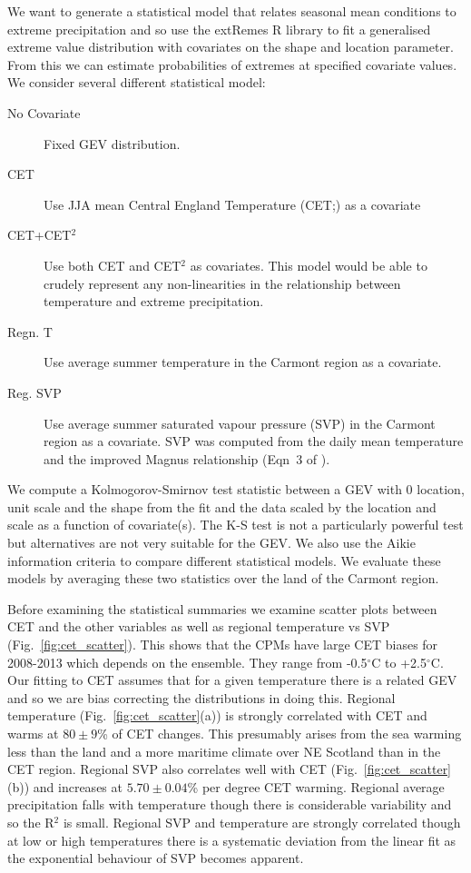 \documentclass[11pt,a4paper]{article}
\begin{document}
We want to generate a statistical model that relates seasonal mean conditions to extreme precipitation and so use the extRemes R library\parencite{gilleland2016extremes} to fit a generalised extreme value distribution\parencite{Coles_2001} with covariates on the shape and location parameter. From this we can estimate probabilities of extremes at specified covariate values.  We consider several different statistical model:
\begin{description}
	\item[No Covariate] Fixed GEV distribution. 
	\item[CET] Use JJA mean Central England Temperature (CET;\cite{parker92cet}) as a covariate
	\item[CET+CET$^2$] Use both CET and CET$^2$ as covariates. This model would be able to crudely represent any non-linearities in the relationship between temperature and extreme precipitation. 
	\item[Regn. T] Use average summer temperature in the Carmont region as a covariate.
	\item[Reg. SVP] Use average summer saturated vapour pressure (SVP) in the Carmont region as a covariate. SVP was computed from the daily mean temperature and the improved Magnus relationship (Eqn~3 of \cite{Huang2018SVP}).
\end{description}
We compute a Kolmogorov-Smirnov test statistic between a GEV with 0 location, unit scale and the shape from the fit and the data scaled by the location and scale as a function of covariate(s). The K-S test is not a particularly powerful test\parencite{stephens74fit} but alternatives are not very suitable for the GEV. We also use the Aikie information criteria\parencite{akaike74aic} to compare different statistical models.  We evaluate these models by averaging these two statistics over the land of the Carmont region.

Before examining  the statistical summaries we examine scatter plots between CET and the other variables as well as regional temperature vs SVP (Fig.~\ref{fig:cet_scatter}). This shows that the CPMs have large CET biases for 2008-2013 which depends on the ensemble. They range from -0.5$^\circ$C to +2.5$^\circ$C. Our fitting to CET assumes that for a given temperature there is a related GEV and so we are bias correcting the distributions in doing this. Regional temperature (Fig.~\ref{fig:cet_scatter}(a)) is strongly correlated with CET and warms at $80\pm9$\% of CET changes. This presumably arises from the sea warming less than the land and a more maritime climate over NE Scotland than in the CET region. Regional SVP also correlates well with CET (Fig.~\ref{fig:cet_scatter}(b)) and increases at $5.70\pm 0.04$\% per degree CET warming. Regional  average precipitation falls with temperature though there is considerable variability and so the R$^2$ is small.  Regional SVP and temperature are strongly correlated though at low or high temperatures there is a systematic deviation from the linear fit as the exponential behaviour of SVP becomes apparent. 
\end{document}
